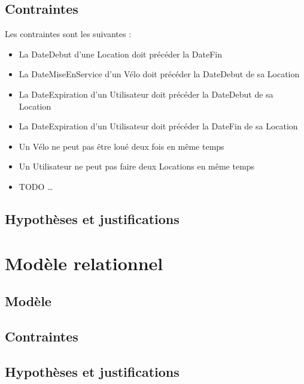 \documentclass[a4paper,10pt]{report}
\begin{document}
\section{Contraintes}
Les contraintes sont les suivantes :
\begin{itemize}
  \item La DateDebut d'une Location doit précéder la DateFin 
  \item La DateMiseEnService d'un Vélo doit précéder la DateDebut de sa Location
  \item La DateExpiration d'un Utilisateur doit précéder la DateDebut de sa Location
  \item La DateExpiration d'un Utilisateur doit précéder la DateFin de sa Location
  \item Un Vélo ne peut pas être loué deux fois en même temps
  \item Un Utilisateur ne peut pas faire deux Locations en même temps
  \item TODO \ldots
\end{itemize}
\section{Hypothèses et justifications}

\chapter{Modèle relationnel}
\section{Modèle}
\section{Contraintes}
\section{Hypothèses et justifications}
\end{document}
